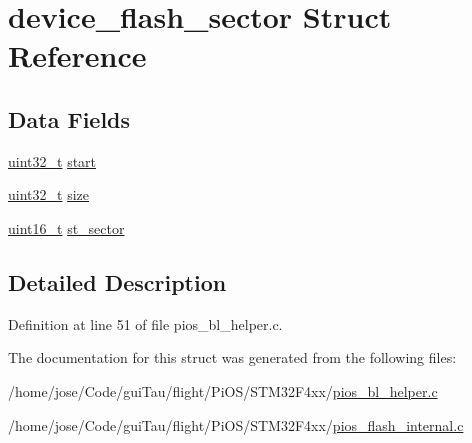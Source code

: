 \hypertarget{structdevice__flash__sector}{\section{device\-\_\-flash\-\_\-sector Struct Reference}
\label{structdevice__flash__sector}
}
\subsection*{Data Fields}
\begin{DoxyCompactItemize}
\item 
\hyperlink{stdint_8h_a435d1572bf3f880d55459d9805097f62}{uint32\-\_\-t} \hyperlink{group___p_i_o_s___b_o_o_t_l_o_a_d_e_r_ga8efbeb4ac8f39002737374387a063360}{start}
\item 
\hyperlink{stdint_8h_a435d1572bf3f880d55459d9805097f62}{uint32\-\_\-t} \hyperlink{group___p_i_o_s___b_o_o_t_l_o_a_d_e_r_ga53bfb33fe9a388542e57e8314108fd0a}{size}
\item 
\hyperlink{stdint_8h_a273cf69d639a59973b6019625df33e30}{uint16\-\_\-t} \hyperlink{group___p_i_o_s___b_o_o_t_l_o_a_d_e_r_gaf71821c5c2fdb240c7d27d8371b38fbd}{st\-\_\-sector}
\end{DoxyCompactItemize}


\subsection{Detailed Description}


Definition at line 51 of file pios\-\_\-bl\-\_\-helper.\-c.



The documentation for this struct was generated from the following files\-:\begin{DoxyCompactItemize}
\item 
/home/jose/\-Code/gui\-Tau/flight/\-Pi\-O\-S/\-S\-T\-M32\-F4xx/\hyperlink{_s_t_m32_f4xx_2pios__bl__helper_8c}{pios\-\_\-bl\-\_\-helper.\-c}\item 
/home/jose/\-Code/gui\-Tau/flight/\-Pi\-O\-S/\-S\-T\-M32\-F4xx/\hyperlink{_s_t_m32_f4xx_2pios__flash__internal_8c}{pios\-\_\-flash\-\_\-internal.\-c}\end{DoxyCompactItemize}
